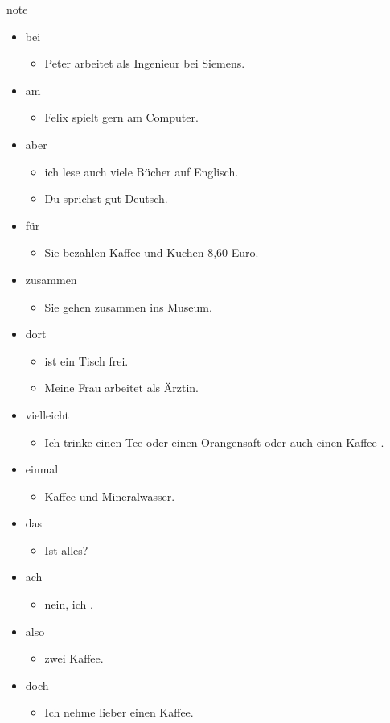 \begin{syntax}{note}{}
\begin{itemize}
	\item bei \begin{itemize}
		\item Peter arbeitet als Ingenieur bei Siemens.
	\end{itemize}
	\item am \begin{itemize}
		\item Felix spielt gern am Computer.
	\end{itemize}
	\item aber \begin{itemize}
			\item {} ich lese auch viele Bücher auf Englisch.
			\item Du sprichst  gut Deutsch.
	\end{itemize}
	\item für \begin{itemize}
			\item Sie bezahlen  Kaffee und Kuchen 8,60 Euro.
	\end{itemize}
	\item zusammen \begin{itemize}
			\item Sie gehen zusammen ins Museum.
	\end{itemize}
	\item dort \begin{itemize}
			\item {} ist ein Tisch frei.
			\item Meine Frau arbeitet  als Ärztin.
	\end{itemize}
	\item vielleicht \begin{itemize}
			\item Ich trinke  einen Tee oder einen Orangensaft oder  auch einen Kaffee \fillhere .
	\end{itemize}
	\item einmal \begin{itemize}
			\item {} Kaffee und  Mineralwasser.
	\end{itemize}
	\item das \begin{itemize}
			\item Ist  alles?
	\end{itemize}
	\item ach \begin{itemize}
			\item {} nein, ich \fillhere .
	\end{itemize}
	\item also \begin{itemize}
			\item {} zwei Kaffee.
	\end{itemize}
	\item doch \begin{itemize}
			\item Ich nehme  lieber einen Kaffee.
	\end{itemize}
\end{itemize}
\end{syntax}
